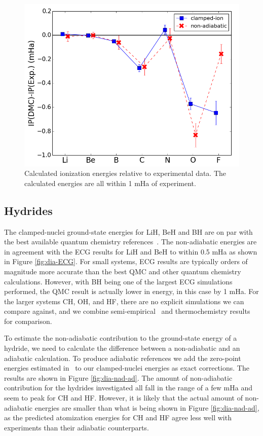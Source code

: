 \documentclass[pra,superscriptaddress,groupedaddress,twocolumn]{revtex4}
\begin{document}
\begin{figure}
\centering
\includegraphics[scale=.4]{Figures/ionization}
\caption{Calculated ionization energies relative to experimental data. The calculated energies are all within 1 mHa of experiment. \label{fig:ionization}}
\end{figure}

\subsection{Hydrides}



The clamped-nuclei ground-state energies for LiH, BeH and BH are on par with the best available quantum chemistry references~\cite{Adamowicz_LiH,Koput_BeH,Miliordos_BH}. The non-adiabatic energies are in agreement with the ECG results for LiH and BeH to within 0.5 mHa as shown in Figure \ref{fig:dia-ECG}. For small systems, ECG results are typically orders of magnitude more accurate than the best QMC and other quantum chemistry calculations. However, with BH being one of the largest ECG simulations performed, the QMC result is actually lower in energy, in this case by 1 mHa. For the larger systems CH, OH, and HF, there are no explicit simulations we can compare against, and we combine semi-empirical~\cite{Davidson_Atoms} and thermochemistry results~\cite{Feller_Corrections} for comparison.

To estimate the non-adiabatic contribution to the ground-state energy of a hydride, we need to calculate the difference between a non-adiabatic and an adiabatic calculation. To produce adiabatic references we add the zero-point energies estimated in~\cite{Feller_Corrections} to our clamped-nuclei energies as exact corrections. The results are shown in Figure \ref{fig:dia-nad-ad}. The amount of non-adiabatic contribution for the hydrides investigated all fall in the range of a few mHa and seem to peak for CH and HF. However, it is likely that the actual amount of non-adiabatic energies are smaller than what is being shown in Figure \ref{fig:dia-nad-ad}, as the predicted atomization energies for CH and HF agree less well with experiments than their adiabatic counterparts.
\end{document}
